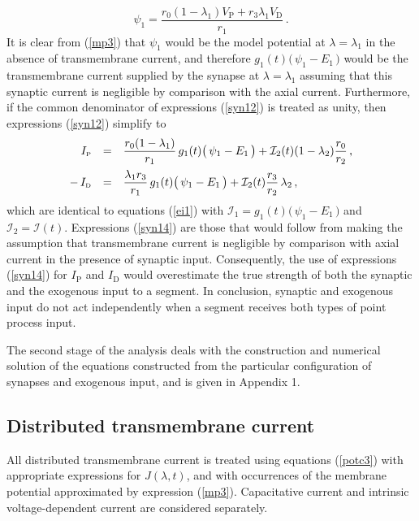 \begin{equation}\label{syn13}
\psi_1 = \frac{r_0(1-\lambda_1) V_\mathrm{P} + r_3 \lambda_1
V_\mathrm{D}}{r_1}\,.
\end{equation}
It is clear from (\ref{mp3}) that $\psi_1$ would be the model
potential at $\lambda=\lambda_1$ in the absence of transmembrane
current, and therefore $g_1(t)\big(\,\psi_1-E_1\,\big)$ would be
the transmembrane current supplied by the synapse at
$\lambda=\lambda_1$ assuming that this synaptic current is
negligible by comparison with the axial current. Furthermore, if
the common denominator of expressions (\ref{syn12}) is treated as
unity, then expressions (\ref{syn12}) simplify to
\begin{equation}\label{syn14}
\begin{array}{rcl}
I_{\mbox{\tiny P}} & = & \displaystyle\frac{r_0(1-\lambda_1)}{r_1}\,
g_1(t)\big(\,\psi_1-E_1\,\big)
+\mathcal{I}_2(t)(1-\lambda_2)\frac{r_0}{r_2}\,,\\[10pt]
-\,I_{\mbox{\tiny D}} & = & \displaystyle\frac{\lambda_1
r_3}{r_1}\,g_1(t)\big(\,\psi_1-E_1\,\big)
+\mathcal{I}_2(t)\frac{r_3}{r_2}\,\lambda_2\,,
\end{array}
\end{equation}
which are identical to equations (\ref{ei1}) with
$\mathcal{I}_1=g_1(t)\big(\,\psi_1-E_1\,\big)$ and
$\mathcal{I}_2=\mathcal{I}(t)$. Expressions (\ref{syn14}) are
those that would follow from making the assumption that
transmembrane current is negligible by comparison with axial
current in the presence of synaptic input. Consequently, the use
of expressions (\ref{syn14}) for $I_\mathrm{P}$ and $I_\mathrm{D}$
would overestimate the true strength of both the synaptic and the
exogenous input to a segment. In conclusion, synaptic and
exogenous input do not act independently when a segment receives
both types of point process input.

The second stage of the analysis deals with the construction and
numerical solution of the equations constructed from the
particular configuration of synapses and exogenous input, and is
given in Appendix 1.

\subsection{Distributed transmembrane current}

All distributed transmembrane current is treated using equations
(\ref{potc3}) with appropriate expressions for $J(\lambda,t)$, and
with occurrences of the membrane potential approximated by
expression (\ref{mp3}). Capacitative current and intrinsic
voltage-dependent current are considered separately.

